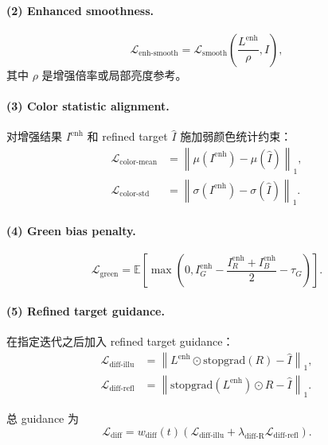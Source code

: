 \documentclass[11pt]{article}
\begin{document}
\paragraph{(2) Enhanced smoothness.}
\begin{equation}
    \mathcal{L}_{\text{enh-smooth}}
    =
    \mathcal{L}_{\text{smooth}}
    \left(
        \frac{L^{\text{enh}}}{\rho},
        I
    \right),
\end{equation}
其中 $\rho$ 是增强倍率或局部亮度参考。

\paragraph{(3) Color statistic alignment.}
对增强结果 $I^{\text{enh}}$ 和 refined target $\hat{I}$ 施加弱颜色统计约束：
\begin{align}
    \mathcal{L}_{\text{color-mean}}
    &=
    \left\|
        \mu(I^{\text{enh}}) - \mu(\hat{I})
    \right\|_1, \\
    \mathcal{L}_{\text{color-std}}
    &=
    \left\|
        \sigma(I^{\text{enh}}) - \sigma(\hat{I})
    \right\|_1.
\end{align}

\paragraph{(4) Green bias penalty.}
\begin{equation}
    \mathcal{L}_{\text{green}}
    =
    \mathbb{E}
    \left[
        \max
        \left(
            0,
            I^{\text{enh}}_G
            -
            \frac{I^{\text{enh}}_R + I^{\text{enh}}_B}{2}
            -
            \tau_G
        \right)
    \right].
\end{equation}

\paragraph{(5) Refined target guidance.}
在指定迭代之后加入 refined target guidance：
\begin{align}
    \mathcal{L}_{\text{diff-illu}}
    &=
    \left\|
        L^{\text{enh}} \odot \mathrm{stopgrad}(R)
        -
        \hat{I}
    \right\|_1, \\
    \mathcal{L}_{\text{diff-refl}}
    &=
    \left\|
        \mathrm{stopgrad}(L^{\text{enh}}) \odot R
        -
        \hat{I}
    \right\|_1.
\end{align}

总 guidance 为
\begin{equation}
    \mathcal{L}_{\text{diff}}
    =
    w_{\text{diff}}(t)
    \left(
        \mathcal{L}_{\text{diff-illu}}
        +
        \lambda_{\text{diff-R}}
        \mathcal{L}_{\text{diff-refl}}
    \right).
\end{equation}
\end{document}
